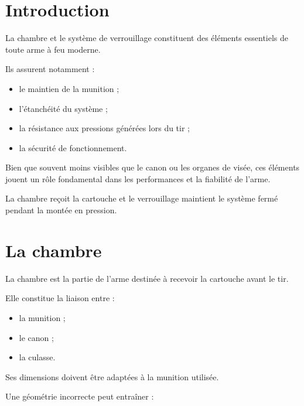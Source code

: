 
\section{Introduction}

La chambre et le système de verrouillage constituent des éléments essentiels
de toute arme à feu moderne.

Ils assurent notamment :

\begin{itemize}
    \item le maintien de la munition ;
    \item l'étanchéité du système ;
    \item la résistance aux pressions générées lors du tir ;
    \item la sécurité de fonctionnement.
\end{itemize}

Bien que souvent moins visibles que le canon ou les organes de visée, ces
éléments jouent un rôle fondamental dans les performances et la fiabilité de
l'arme.

\begin{aretenir}

La chambre reçoit la cartouche et le verrouillage maintient le système fermé
pendant la montée en pression.

\end{aretenir}

\section{La chambre}

La chambre est la partie de l'arme destinée à recevoir la cartouche avant le
tir.

Elle constitue la liaison entre :

\begin{itemize}
    \item la munition ;
    \item le canon ;
    \item la culasse.
\end{itemize}

Ses dimensions doivent être adaptées à la munition utilisée.

Une géométrie incorrecte peut entraîner :

